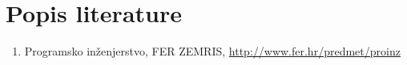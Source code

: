 \chapter*{Popis literature}
	 	
 		
		
		\begin{enumerate}
			
			
			\item  Programsko inženjerstvo, FER ZEMRIS, \url{http://www.fer.hr/predmet/proinz}
			
			
		\end{enumerate}
		
		 